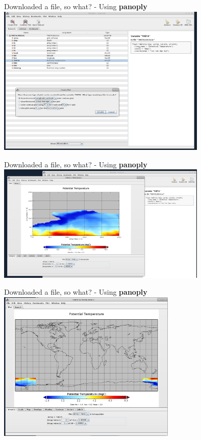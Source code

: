\begin{frame}{\insertsectionnumber{ |} Downloaded a file, so what? - Using \textbf{panoply}}
    \centering\includegraphics[width=10cm]{images/Panoply1.png} \\
\end{frame}


\begin{frame}{\insertsectionnumber{ |} Downloaded a file, so what? - Using \textbf{panoply}}
    \centering\includegraphics[width=10cm]{images/Panoply2.png} \\
\end{frame}


\begin{frame}{\insertsectionnumber{ |} Downloaded a file, so what? - Using \textbf{panoply}}
    \centering\includegraphics[width=8.5cm]{images/Panoply3.png} \\
\end{frame}


